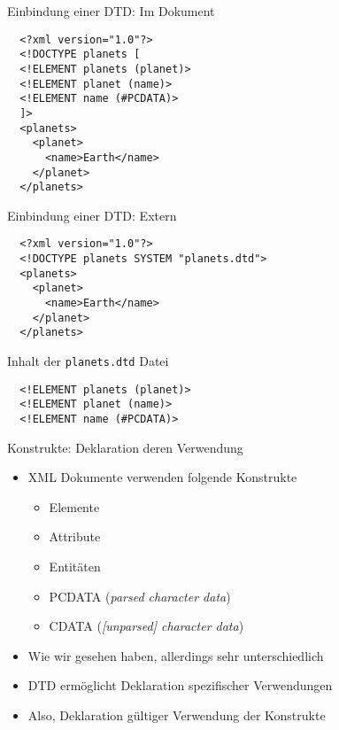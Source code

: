 \documentclass{beamer}
\begin{document}
\begin{frame}[fragile]{Einbindung einer DTD: Im Dokument}
	
	\lstset{language=XML}
	\begin{lstlisting}	
  <?xml version="1.0"?>
  <!DOCTYPE planets [
  <!ELEMENT planets (planet)>
  <!ELEMENT planet (name)>
  <!ELEMENT name (#PCDATA)>
  ]>
  <planets>
    <planet>
      <name>Earth</name>
    </planet>
  </planets>		
	\end{lstlisting}

\end{frame}

\begin{frame}[fragile]{Einbindung einer DTD: Extern}
	
	\lstset{language=XML}
	\begin{lstlisting}	
  <?xml version="1.0"?>
  <!DOCTYPE planets SYSTEM "planets.dtd">
  <planets>
    <planet>
      <name>Earth</name>
    </planet>
  </planets>		
	\end{lstlisting}
	
  \vspace{1cm}

  Inhalt der \texttt{planets.dtd} Datei
	
	\begin{lstlisting}
  <!ELEMENT planets (planet)>
  <!ELEMENT planet (name)>
  <!ELEMENT name (#PCDATA)>
	\end{lstlisting}

\end{frame}

\begin{frame}{Konstrukte: Deklaration deren Verwendung}
	
	\begin{itemize}
		\item XML Dokumente verwenden folgende Konstrukte
		\begin{itemize}
			\item Elemente
			\item Attribute
			\item Entitäten
			\item PCDATA (\emph{parsed character data})
			\item CDATA (\emph{[unparsed] character data})
		\end{itemize}
		\item Wie wir gesehen haben, allerdings sehr unterschiedlich
		\item DTD ermöglicht Deklaration spezifischer Verwendungen
		\item Also, Deklaration gültiger Verwendung der Konstrukte
	\end{itemize}
	
\end{frame}
\end{document}
